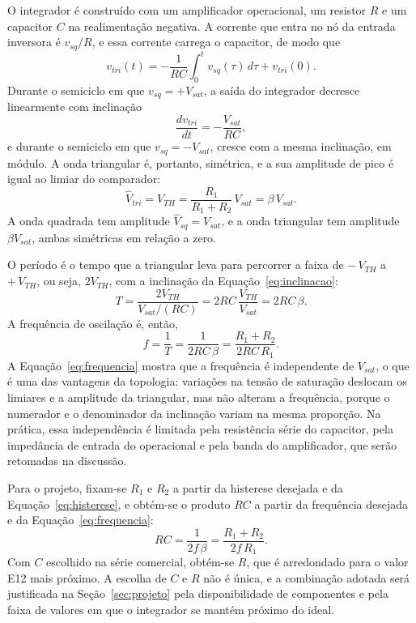 \documentclass[11pt,a4paper]{article}
\begin{document}
O integrador é construído com um amplificador operacional, um resistor $R$ e um
capacitor $C$ na realimentação negativa. A corrente que entra no nó da entrada
inversora é $v_{sq}/R$, e essa corrente carrega o capacitor, de modo que
\begin{equation}
v_{tri}(t) = -\frac{1}{RC}\int_0^t v_{sq}(\tau)\,d\tau + v_{tri}(0).
\label{eq:integrador}
\end{equation}
Durante o semiciclo em que $v_{sq} = +V_{sat}$, a saída do integrador decresce
linearmente com inclinação
\begin{equation}
\frac{dv_{tri}}{dt} = -\frac{V_{sat}}{RC},
\label{eq:inclinacao}
\end{equation}
e durante o semiciclo em que $v_{sq} = -V_{sat}$, cresce com a mesma inclinação,
em módulo. A onda triangular é, portanto, simétrica, e a sua amplitude de pico é
igual ao limiar do comparador:
\begin{equation}
\hat V_{tri} = V_{TH} = \frac{R_1}{R_1 + R_2}\,V_{sat} = \beta\,V_{sat}.
\label{eq:amplitude_tri}
\end{equation}
A onda quadrada tem amplitude $\hat V_{sq} = V_{sat}$, e a onda triangular tem
amplitude $\beta V_{sat}$, ambas simétricas em relação a zero.
 
O período é o tempo que a triangular leva para percorrer a faixa de
$-\,V_{TH}$ a $+\,V_{TH}$, ou seja, $2V_{TH}$, com a inclinação da
Equação~\eqref{eq:inclinacao}:
\begin{equation}
T = \frac{2V_{TH}}{V_{sat}/(RC)} = 2RC\,\frac{V_{TH}}{V_{sat}}
= 2RC\,\beta.
\label{eq:periodo}
\end{equation}
A frequência de oscilação é, então,
\begin{equation}
f = \frac{1}{T} = \frac{1}{2RC\,\beta}
= \frac{R_1 + R_2}{2RC\,R_1}.
\label{eq:frequencia}
\end{equation}
A Equação~\eqref{eq:frequencia} mostra que a frequência é independente de
$V_{sat}$, o que é uma das vantagens da topologia: variações na tensão de
saturação deslocam os limiares e a amplitude da triangular, mas não alteram a
frequência, porque o numerador e o denominador da inclinação variam na mesma
proporção. Na prática, essa independência é limitada pela resistência série do
capacitor, pela impedância de entrada do operacional e pela banda do
amplificador, que serão retomadas na discussão.
 
Para o projeto, fixam-se $R_1$ e $R_2$ a partir da histerese desejada e da
Equação~\eqref{eq:histerese}, e obtém-se o produto $RC$ a partir da frequência
desejada e da Equação~\eqref{eq:frequencia}:
\begin{equation}
RC = \frac{1}{2f\,\beta} = \frac{R_1 + R_2}{2f\,R_1}.
\label{eq:rc}
\end{equation}
Com $C$ escolhido na série comercial, obtém-se $R$, que é arredondado para o
valor E12 mais próximo. A escolha de $C$ e $R$ não é única, e a combinação
adotada será justificada na Seção~\ref{sec:projeto} pela disponibilidade de
componentes e pela faixa de valores em que o integrador se mantém próximo do
ideal.
 
\end{document}
